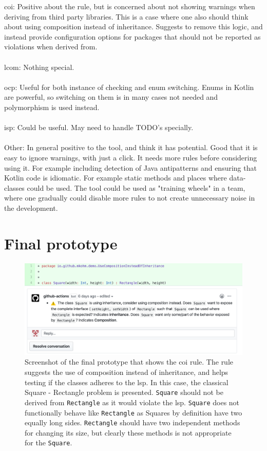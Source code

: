 \noindent \gls{coi}: Positive about the rule, but is concerned about not showing warnings when deriving from third party libraries. This is a case where one also should think about using composition instead of inheritance. Suggests to remove this logic, and instead provide configuration options for packages that should not be reported as violations when derived from.  \\\\

\noindent \gls{lcom}: Nothing special. \\\\

\noindent \gls{ocp}: Useful for both instance of checking and enum switching. Enums in Kotlin are powerful, so switching on them is in many cases not needed and polymorphism is used instead.\\\\

\noindent \gls{isp}: Could be useful. May need to handle TODO's specially. \\\\

\noindent Other: In general positive to the tool, and think it has potential. Good that it is easy to ignore warnings, with just a click. It needs more rules before considering using it. For example including detection of Java antipatterns and ensuring that Kotlin code is idiomatic. For example static methods and places where data-classes could be used. The tool could be used as "training wheels" in a team, where one gradually could disable more rules to not create unnecessary noise in the development.

\clearpage
\section{Final prototype}
\label{final-artifact}
\begin{figure}[h!]
    \centering
    \includegraphics[width=\textwidth]{images/final_coh.png}
    \caption{Screenshot of the final prototype that shows the \gls{coi} rule. The rule suggests the use of composition instead of inheritance, and helps testing if the classes adheres to the \gls{lsp}. In this case, the classical Square - Rectangle problem is presented. \texttt{Square} should not be derived from \texttt{Rectangle} as it would violate the \gls{lsp}. \texttt{Square} does not functionally behave like \texttt{Rectangle} as Squares by definition have two equally long sides. \texttt{Rectangle} should have two independent methods for changing its size, but clearly these methods is not appropriate for the \texttt{Square}.}
\end{figure}

